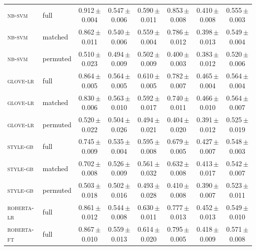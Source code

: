 \begin{table}[t]
\begin{tabular}{@{}llcccccc@{}}
\addlinespace
\textsc{nb-svm} & full & 0.912\,{\scriptsize$\pm$0.004} & 0.547\,{\scriptsize$\pm$0.006} & 0.590\,{\scriptsize$\pm$0.011} & 0.853\,{\scriptsize$\pm$0.008} & 0.410\,{\scriptsize$\pm$0.008} & 0.555\,{\scriptsize$\pm$0.003} \\
\textsc{nb-svm} & matched & 0.862\,{\scriptsize$\pm$0.011} & 0.540\,{\scriptsize$\pm$0.006} & 0.559\,{\scriptsize$\pm$0.004} & 0.786\,{\scriptsize$\pm$0.012} & 0.398\,{\scriptsize$\pm$0.013} & 0.549\,{\scriptsize$\pm$0.004} \\
\textsc{nb-svm} & permuted & 0.510\,{\scriptsize$\pm$0.023} & 0.494\,{\scriptsize$\pm$0.009} & 0.502\,{\scriptsize$\pm$0.009} & 0.400\,{\scriptsize$\pm$0.003} & 0.383\,{\scriptsize$\pm$0.012} & 0.520\,{\scriptsize$\pm$0.006} \\
\addlinespace
\textsc{glove-lr} & full & 0.864\,{\scriptsize$\pm$0.005} & 0.564\,{\scriptsize$\pm$0.005} & 0.610\,{\scriptsize$\pm$0.005} & 0.782\,{\scriptsize$\pm$0.007} & 0.465\,{\scriptsize$\pm$0.004} & 0.564\,{\scriptsize$\pm$0.004} \\
\textsc{glove-lr} & matched & 0.830\,{\scriptsize$\pm$0.006} & 0.563\,{\scriptsize$\pm$0.010} & 0.592\,{\scriptsize$\pm$0.017} & 0.740\,{\scriptsize$\pm$0.011} & 0.466\,{\scriptsize$\pm$0.010} & 0.564\,{\scriptsize$\pm$0.007} \\
\textsc{glove-lr} & permuted & 0.520\,{\scriptsize$\pm$0.022} & 0.504\,{\scriptsize$\pm$0.026} & 0.494\,{\scriptsize$\pm$0.021} & 0.404\,{\scriptsize$\pm$0.020} & 0.391\,{\scriptsize$\pm$0.012} & 0.525\,{\scriptsize$\pm$0.019} \\
\addlinespace
\textsc{style-gb} & full & 0.745\,{\scriptsize$\pm$0.009} & 0.535\,{\scriptsize$\pm$0.004} & 0.595\,{\scriptsize$\pm$0.008} & 0.679\,{\scriptsize$\pm$0.005} & 0.427\,{\scriptsize$\pm$0.007} & 0.548\,{\scriptsize$\pm$0.003} \\
\textsc{style-gb} & matched & 0.702\,{\scriptsize$\pm$0.008} & 0.526\,{\scriptsize$\pm$0.009} & 0.561\,{\scriptsize$\pm$0.032} & 0.632\,{\scriptsize$\pm$0.008} & 0.413\,{\scriptsize$\pm$0.017} & 0.542\,{\scriptsize$\pm$0.007} \\
\textsc{style-gb} & permuted & 0.503\,{\scriptsize$\pm$0.018} & 0.502\,{\scriptsize$\pm$0.016} & 0.493\,{\scriptsize$\pm$0.028} & 0.410\,{\scriptsize$\pm$0.008} & 0.390\,{\scriptsize$\pm$0.007} & 0.523\,{\scriptsize$\pm$0.011} \\
\addlinespace
\textsc{roberta-lr} & full & 0.861\,{\scriptsize$\pm$0.012} & 0.544\,{\scriptsize$\pm$0.008} & 0.630\,{\scriptsize$\pm$0.011} & 0.777\,{\scriptsize$\pm$0.013} & 0.452\,{\scriptsize$\pm$0.013} & 0.549\,{\scriptsize$\pm$0.010} \\
\addlinespace
\textsc{roberta-ft} & full & 0.867\,{\scriptsize$\pm$0.010} & 0.559\,{\scriptsize$\pm$0.013} & 0.614\,{\scriptsize$\pm$0.020} & 0.795\,{\scriptsize$\pm$0.005} & 0.418\,{\scriptsize$\pm$0.009} & 0.571\,{\scriptsize$\pm$0.008} \\
\bottomrule
\end{tabular}
\end{table}
